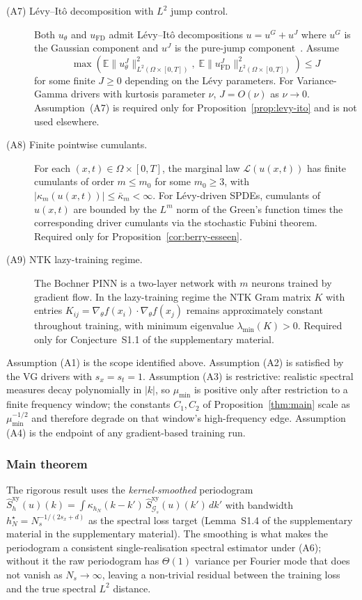 \documentclass[review,12pt]{elsarticle}
\begin{document}
\begin{description}
\item[(A7) L\'evy--It\^o decomposition with $L^2$ jump control.]
Both $u_\theta$ and $u_{\mathrm{FD}}$ admit L\'evy--It\^o decompositions
$u=u^G+u^J$ where $u^G$ is the Gaussian component and $u^J$ is the
pure-jump component~\cite{ContTankov2003}.
Assume
\[
\max\!\left(\mathbb{E}\|u_\theta^J\|^2_{L^2(\Omega\times[0,T])},\;
\mathbb{E}\|u_{\mathrm{FD}}^J\|^2_{L^2(\Omega\times[0,T])}\right)\le J
\]
for some finite $J\ge 0$ depending on the L\'evy parameters.
For Variance-Gamma drivers with kurtosis parameter $\nu$, $J=O(\nu)$
as $\nu\to 0$.
Assumption~(A7) is required only for
Proposition~\ref{prop:levy-ito} and is not used elsewhere.

\item[(A8) Finite pointwise cumulants.]
For each $(x,t)\in\Omega\times[0,T]$, the marginal law
$\mathcal{L}(u(x,t))$ has finite cumulants of order $m\le m_0$ for
some $m_0\ge 3$, with $|\kappa_m(u(x,t))|\le\bar\kappa_m<\infty$.
For Lévy-driven SPDEs, cumulants of $u(x,t)$ are bounded by
the $L^m$ norm of the Green's function times the corresponding driver
cumulants via the stochastic Fubini theorem.
Required only for Proposition~\ref{cor:berry-esseen}.

\item[(A9) NTK lazy-training regime.]
The Bochner PINN is a two-layer network with $m$ neurons trained by
gradient flow. In the lazy-training regime the NTK Gram matrix $K$
with entries $K_{ij}=\nabla_\theta f(x_i)\cdot\nabla_\theta f(x_j)$
remains approximately constant throughout training, with minimum
eigenvalue $\lambda_{\min}(K)>0$.
Required only for Conjecture~S1.1 of the supplementary material.
\end{description}

Assumption (A1) is the scope identified above.
Assumption (A2) is satisfied by the VG drivers with
\(s_x = s_t = 1\). Assumption (A3) is restrictive: realistic
spectral measures decay polynomially in \(|k|\), so \(\mu_{\min}\)
is positive only after restriction to a finite frequency window;
the constants \(C_1, C_2\) of Proposition~\ref{thm:main} scale as
\(\mu_{\min}^{-1/2}\) and therefore degrade on that window's
high-frequency edge. Assumption (A4) is the endpoint of any
gradient-based training run.

\subsubsection{Main theorem}

The rigorous result uses the \emph{kernel-smoothed} periodogram
$\widehat S^{\mathrm{xy}}_h(u)(k) = \int \kappa_{h_N}(k-k')\,
\widehat S^{\mathrm{xy}}_{\mathcal G_s}(u)(k')\,dk'$ with bandwidth
$h_N^\star = N_s^{-1/(2s_x+d)}$ as the spectral loss target
(Lemma~S1.4 of the supplementary material in the supplementary material).
The smoothing is what makes the periodogram a consistent
single-realisation spectral estimator under (A6); without it the
raw periodogram has $\Theta(1)$ variance per Fourier mode that
does not vanish as $N_s \to \infty$, leaving a non-trivial residual
between the training loss and the true spectral $L^2$ distance.
\end{document}
